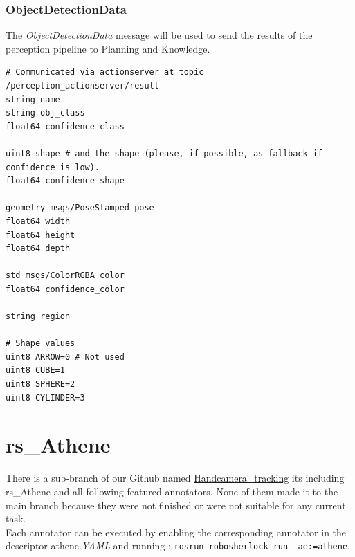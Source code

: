 \documentclass[main.tex]{subfiles}
\begin{document}
\subsubsection{ObjectDetectionData}
The \textit{ObjectDetectionData} message will be used to send the results of the perception pipeline to Planning and Knowledge.

\begin{lstlisting}
# Communicated via actionserver at topic /perception_actionserver/result
string name
string obj_class
float64 confidence_class

uint8 shape # and the shape (please, if possible, as fallback if confidence is low). 
float64 confidence_shape

geometry_msgs/PoseStamped pose
float64 width
float64 height
float64 depth

std_msgs/ColorRGBA color
float64 confidence_color

string region

# Shape values
uint8 ARROW=0 # Not used
uint8 CUBE=1
uint8 SPHERE=2
uint8 CYLINDER=3
\end{lstlisting}

			\section{rs\_Athene}
There is a sub-branch of our Github named \href{https://github.com/SUTURO/suturo_perception/tree/Handcamera_tracking}{Handcamera\_tracking}
its including rs\_Athene and all following featured annotators. 
None of them made it to the main branch because they were not finished or were not suitable for any current task. \\
Each annotator can be executed by enabling the corresponding annotator in the descriptor athene.\textit{YAML} and running : \texttt{rosrun robosherlock run \_ae:=athene}. 
\end{document}
